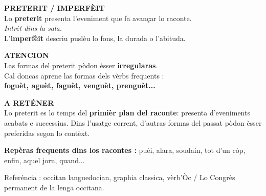 \documentclass[a4paper,11pt]{article}
\begin{document}
\begin{minipage}{0.91\textwidth}
\vspace{2mm}
\begin{minipage}{0.485\textwidth}
\begin{bluebox}[height=3.25cm]
\textbf{\color{BlueDark}PRETERIT / IMPERFÈIT}\\[1mm]
Lo \textbf{preterit} presenta l'eveniment que fa avançar lo raconte.\\[1mm]
\textit{Intrèt dins la sala.}\\[1mm]
L'\textbf{imperfèit} descriu puslèu lo fons, la durada o l'abituda.
\end{bluebox}
\end{minipage}\hfill
\begin{minipage}{0.485\textwidth}
\begin{warnbox}[height=3.25cm]
\textbf{\color{Red}ATENCION}\\[1mm]
Las formas del preterit pòdon èsser \textbf{irregularas}.\\[1mm]
Cal doncas aprene las formas dels vèrbs frequents :\\
\textbf{foguèt, aguèt, faguèt, venguèt, prenguèt...}
\end{warnbox}
\end{minipage}

\vspace{2mm}
\begin{bluebox}
\textbf{\color{BlueDark}A RETÉNER}\\[1mm]
Lo preterit es lo temps del \textbf{primièr plan del raconte}: presenta d'eveniments acabats
e successius. Dins l'usatge corrent, d'autras formas del passat pòdon èsser preferidas segon lo contèxt.
\end{bluebox}

\vspace{1.5mm}\centering
{\small\color{Grey}\textbf{Repèras frequents dins los racontes :} puèi, alara, soudain, tot d'un còp, enfin, aquel jorn, quand...}

\vspace{1mm}
{\scriptsize\color{Grey}Referéncia : occitan languedocian, graphia classica, vèrb'Òc / Lo Congrès permanent de la lenga occitana.}

\end{minipage}
\end{document}
